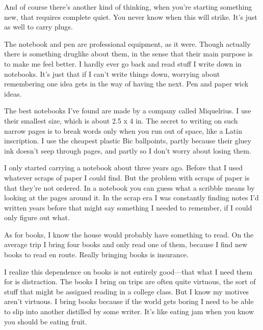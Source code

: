 And of course there's another
                  kind of thinking, when you're starting something new, that
                  requires complete quiet. You never know when this will strike.
                  It's just as well to carry plugs.

The notebook and
                  pen are professional equipment, as it were. Though actually
                  there is something druglike about them, in the sense that
                  their main purpose is to make me feel better. I hardly ever go
                  back and read stuff I write down in notebooks. It's just that
                  if I can't write things down, worrying about remembering one
                  idea gets in the way of having the next. Pen and paper wick
                  ideas.

The best notebooks I've found are made by a
                  company called Miquelrius. I use their smallest size, which is
                  about 2.5 x 4 in. The secret to writing on such narrow pages
                  is to break words only when you run out of space, like a Latin
                  inscription. I use the cheapest plastic Bic ballpoints, partly
                  because their gluey ink doesn't seep through pages, and partly
                  so I don't worry about losing them.

I only started
                  carrying a notebook about three years ago. Before that I used
                  whatever scraps of paper I could find. But the problem with
                  scraps of paper is that they're not ordered. In a notebook you
                  can guess what a scribble means by looking at the pages around
                  it. In the scrap era I was constantly finding notes I'd
                  written years before that might say something I needed to
                  remember, if I could only figure out what.

As for
                  books, I know the house would probably have something to read.
                  On the average trip I bring four books and only read one of
                  them, because I find new books to read en route. Really
                  bringing books is insurance.

I realize this
                  dependence on books is not entirely good---that what I
                  need them for is distraction. The books I bring on trips are
                  often quite virtuous, the sort of stuff that might be assigned
                  reading in a college class. But I know my motives aren't
                  virtuous. I bring books because if the world gets boring I
                  need to be able to slip into another distilled by some writer.
                  It's like eating jam when you know you should be eating
                  fruit.


